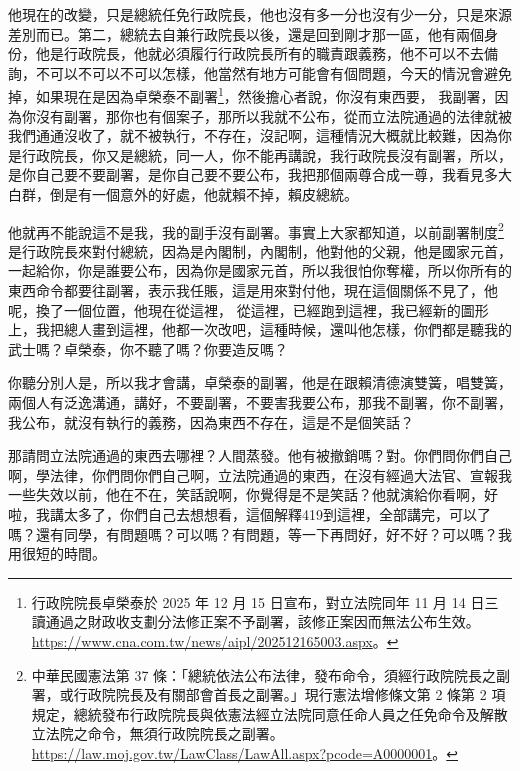 \hypertarget{c08:cue:115}{}他現在的改變，只是總統任免行政院長，他也沒有多一分也沒有少一分，只是來源差別而已。第二，總統去自兼行政院長以後，還是回到剛才那一區，他有兩個身份，他是行政院長，他就必須履行行政院長所有的職責跟義務，他不可以不去備詢，不可以不可以不可以怎樣，他當然有地方可能會有個問題，今天的情況會避免掉，如果現在是因為卓榮泰不副署\footnote{行政院院長卓榮泰於 2025 年 12 月 15 日宣布，對立法院同年 11 月 14 日三讀通過之財政收支劃分法修正案不予副署，該修正案因而無法公布生效。\url{https://www.cna.com.tw/news/aipl/202512165003.aspx}。}，然後擔心者說，你沒有東西要，
\hypertarget{c08:cue:116}{}我副署，因為你沒有副署，那你也有個案子，那所以我就不公布，從而立法院通過的法律就被我們通通沒收了，就不被執行，不存在，沒記啊，這種情況大概就比較難，因為你是行政院長，你又是總統，同一人，你不能再講說，我行政院長沒有副署，所以，是你自己要不要副署，是你自己要不要公布，我把那個兩尊合成一尊，我看見多大白群，倒是有一個意外的好處，他就賴不掉，賴皮總統。

\hypertarget{c08:cue:117}{}他就再不能說這不是我，我的副手沒有副署。事實上大家都知道，以前副署制度\footnote{中華民國憲法第 37 條：「總統依法公布法律，發布命令，須經行政院院長之副署，或行政院院長及有關部會首長之副署。」現行憲法增修條文第 2 條第 2 項規定，總統發布行政院院長與依憲法經立法院同意任命人員之任免命令及解散立法院之命令，無須行政院院長之副署。\url{https://law.moj.gov.tw/LawClass/LawAll.aspx?pcode=A0000001}。}是行政院長來對付總統，因為是內閣制，內閣制，他對他的父親，他是國家元首，一起給你，你是誰要公布，因為你是國家元首，所以我很怕你奪權，所以你所有的東西命令都要往副署，表示我任賬，這是用來對付他，現在這個關係不見了，他呢，換了一個位置，他現在從這裡，
\hypertarget{c08:cue:118}{}從這裡，已經跑到這裡，我已經新的圖形上，我把總人畫到這裡，他都一次改吧，這種時候，還叫他怎樣，你們都是聽我的武士嗎？卓榮泰，你不聽了嗎？你要造反嗎？

\hypertarget{c08:cue:119}{}你聽分別人是，所以我才會講，卓榮泰的副署，他是在跟賴清德演雙簧，唱雙簧，兩個人有泛逸溝通，講好，不要副署，不要害我要公布，那我不副署，你不副署，我公布，就沒有執行的義務，因為東西不存在，這是不是個笑話？

\hypertarget{c08:cue:120}{}那請問立法院通過的東西去哪裡？人間蒸發。他有被撤銷嗎？對。你們問你們自己啊，學法律，你們問你們自己啊，立法院通過的東西，在沒有經過大法官、宣報我一些失效以前，他在不在，笑話說啊，你覺得是不是笑話？他就演給你看啊，好啦，我講太多了，你們自己去想想看，這個解釋419到這裡，全部講完，可以了嗎？還有同學，有問題嗎？可以嗎？有問題，等一下再問好，好不好？可以嗎？我用很短的時間。

